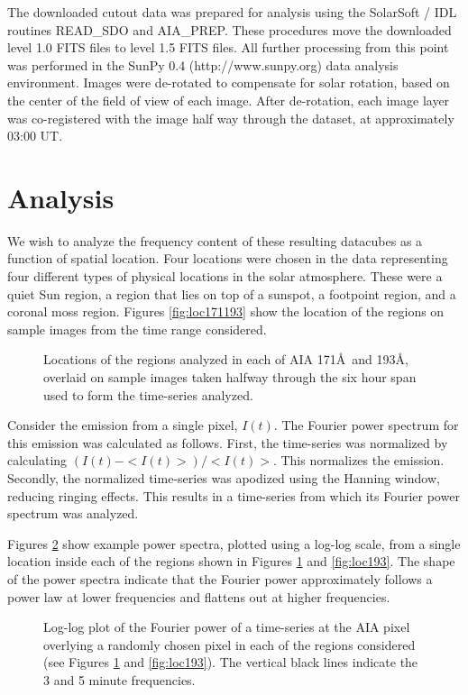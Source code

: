 \documentclass[manuscript]{../aastex52/aastex}
\begin{document}
The downloaded cutout data was prepared for analysis using the
SolarSoft / IDL routines READ\_SDO and AIA\_PREP.  These procedures
move the downloaded level 1.0 FITS files to level 1.5 FITS files.  All
further processing from this point was performed in the SunPy 0.4
(http://www.sunpy.org) data analysis environment.  Images were
de-rotated to compensate for solar rotation, based on the center of
the field of view of each image.  After de-rotation, each image layer
was co-registered with the image half way through the dataset, at
approximately 03:00 UT.

\section{Analysis}\label{sec:anal}
We wish to analyze the frequency content of these resulting datacubes
as a function of spatial location.  Four locations were chosen in the
data representing four different types of physical locations in the
solar atmosphere.  These were a quiet Sun region, a region that lies
on top of a sunspot, a footpoint region, and a coronal moss region.
Figures \ref{fig:loc171193} show the location of the regions on sample
images from the time range considered.

\begin{figure}
\label{fig:loc171}
\caption{Locations of the regions analyzed in each of AIA 171\AA\ and
  193\AA, overlaid on sample images taken halfway through the six hour
  span used to form the time-series analyzed.}
\end{figure}

Consider the emission from a single pixel, $I(t)$.  The Fourier power
spectrum for this emission was calculated as follows.  First, the
time-series was normalized by calculating $(I(t) - <I(t)>)/<I(t)>$.
This normalizes the emission.  Secondly, the normalized time-series
was apodized using the Hanning window, reducing ringing effects.  This
results in a time-series from which its Fourier power spectrum was
analyzed. 

Figures \ref{fig:compare171193} show example power spectra, plotted using
a log-log scale, from a single location inside each of the regions
shown in Figures \ref{fig:loc171} and \ref{fig:loc193}.  The shape of
the power spectra indicate that the Fourier power approximately
follows a power law at lower frequencies and flattens out at higher
frequencies.

\begin{figure}
\label{fig:compare171193}
\caption{Log-log plot of the Fourier power of a time-series at the AIA
  pixel overlying a randomly chosen pixel in each of the regions
  considered (see Figures \protect\ref{fig:loc171} and
  \protect\ref{fig:loc193}).  The vertical black lines indicate the 3
  and 5 minute frequencies.}
\end{figure}
\end{document}
